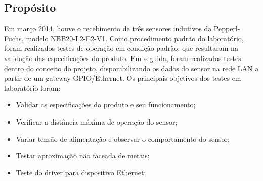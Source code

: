 

\subsection{Propósito}
Em março 2014, houve o recebimento de três sensores indutivos da Pepperl-Fuchs,
modelo NBB20-L2-E2-V1. Como procedimento padrão do laboratório, foram realizados
testes de operação em condição padrão, que resultaram na validação das
especificações do produto. Em seguida, foram realizados testes dentro do
conceito do projeto, disponibilizando os dados do sensor na rede LAN a partir de
um gateway GPIO/Ethernet. Os principais objetivos dos testes em laboratório
foram:
 \begin{itemize}
 \item Validar as especificações do produto e seu funcionamento;
 \item Verificar a distância máxima de operação do sensor;
 \item Variar tensão de alimentação e observar o comportamento do sensor;
 \item Testar aproximação não faceada de metais;
 \item Teste do driver para dispositivo Ethernet;
 \end{itemize}
\label{proposito}